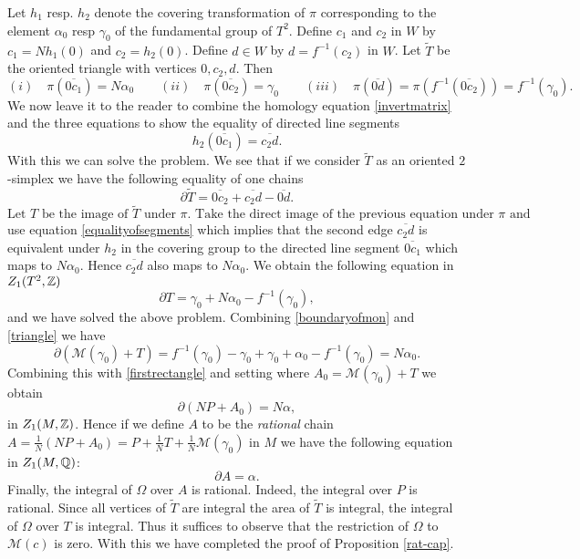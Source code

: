 Let $h_1$ resp. $h_2$ denote the covering transformation of $\pi$ corresponding to the element $\alpha_0$ resp $\gamma_0$ of the fundamental group of $T^2$. Define $c_1$ and $c_2$ in $W$ by $c_1 = Nh_1(0)$ and $c_2=h_2(0)$. Define $d \in W$ by $d =f^{-1}(c_2)$ in $W$. Let $\widetilde{T}$ be the oriented triangle
with vertices $0,c_2,d$.  Then
 \[
 (i) \quad \pi(\overline{0c_1}) =N\alpha_0 \qquad (ii) \quad \pi(\overline{0c_2})= \gamma_0 \qquad (iii) \quad 
 \pi(\overline{0d}) = \pi(f^{-1}(\overline{0c_2})) = f^{-1}(\gamma_0).
 \]
 We now leave it to the reader to combine the homology equation \eqref{invertmatrix} and the three equations to show the equality of directed line segments
\begin{equation}\label{equalityofsegments}
h_2( \overline{0c_1}) = \overline{c_2d}.
\end{equation}
With this we can solve the problem. 
We see that if we consider $\widetilde{T}$ as an oriented $2$-simplex we have the following equality of one chains
$$
\partial \widetilde{T} = \overline{0c_2} + \overline{c_2d} - \overline{0d}.
$$
$\text{Let $T$ be the image of $\widetilde{T}$ under $\pi$. Take the direct image of the previous equation under $\pi$ and}$ use equation \eqref{equalityofsegments} which implies that the second edge $\overline{c_2d}$ is equivalent under $h_2$ in the covering group to the directed line segment $\overline{0c_1}$ which maps to $N\alpha_0$. Hence $\overline{c_2d}$ also maps to $N\alpha_0$. We obtain  the following equation in $Z_1(T^2,\mathbb{Z})$
\begin{equation}\label{triangle}
\partial T =  \gamma_0 + N \alpha_0 - f^{-1}(\gamma_0),
\end{equation}
and we have solved the above problem. Combining \eqref{boundaryofmon} and \eqref{triangle} we have
$$
\partial (\mathcal{M}(\gamma_0) + T ) = f^{-1}(\gamma_0) -\gamma_0 +\gamma_0 + \alpha_0 - f^{-1}(\gamma_0)= N\alpha_0.
$$
Combining this with \eqref{firstrectangle} and setting where $A_0 = \mathcal{M}(\gamma_0) +T$ we obtain
\begin{equation} \label{cap}
\partial (NP + A_0 ) = N \alpha,
\end{equation}
in $Z_1(M,\mathbb{Z})$. Hence if we define $A$ to be the  {\it rational} chain $A = \frac{1}{N} (NP + A_0) = P + \frac{1}{N}T + \frac{1}{N} \mathcal{M}(\gamma_0)$ in $M$ we have the following equation in $Z_1(M,\mathbb{Q})$:
$$
\partial A = \alpha.
$$
Finally, the integral of $\Omega$ over $A$ is rational. Indeed, the integral over $P$ is rational.  Since all vertices of $\widetilde{T}$  are integral the area of $\widetilde{T}$ is integral, the integral of $\Omega$ over $T$ is integral. Thus it suffices to observe that the restriction of $\Omega$ to $\mathcal{M}(c)$ is zero. With this we have completed the proof of Proposition \ref{rat-cap}. 

